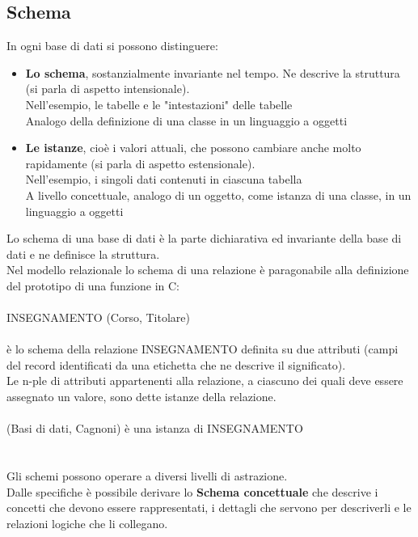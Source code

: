 \documentclass[../main.tex]{subfiles}
\begin{document}
	\subsection{Schema}
	In ogni base di dati si possono distinguere:
	\begin{itemize}
		\item \textbf{Lo schema}, sostanzialmente invariante nel tempo. Ne descrive la struttura (si parla di aspetto intensionale).\\
		Nell’esempio, le tabelle e le "intestazioni" delle tabelle\\
		Analogo della definizione di una classe in un linguaggio a oggetti
		\item \textbf{Le istanze}, cioè i valori attuali, che possono cambiare anche molto rapidamente (si parla di aspetto estensionale).\\
		Nell’esempio, i singoli dati contenuti in ciascuna tabella\\
		A livello concettuale, analogo di un oggetto, come istanza di una classe, in un linguaggio a oggetti
	\end{itemize}
	Lo schema di una base di dati è la parte dichiarativa ed invariante della base di dati e ne definisce la struttura.\\
	Nel modello relazionale lo schema di una relazione è paragonabile alla definizione del prototipo di una funzione in C:\\ \\
	INSEGNAMENTO (Corso, Titolare)\\ \\
	è lo schema della relazione INSEGNAMENTO definita su due attributi (campi del record identificati da una etichetta che ne descrive il significato).\\
	Le n-ple di attributi appartenenti alla relazione, a ciascuno dei quali deve essere assegnato un valore, sono dette istanze della relazione.\\ \\
	(Basi di dati, Cagnoni) è una istanza di INSEGNAMENTO\\ \\ \\
	Gli schemi possono operare a diversi livelli di astrazione.\\
	Dalle specifiche è possibile derivare lo \textbf{Schema concettuale} che descrive i concetti che devono essere rappresentati, i dettagli che servono per descriverli e le relazioni logiche che li collegano.\\ \\
\end{document}
